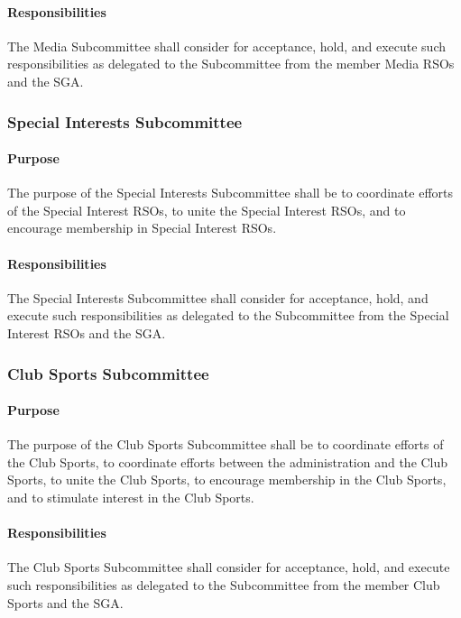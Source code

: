 \documentclass[12pt]{scrreprt}
\begin{document}
\paragraph{Responsibilities}
The Media Subcommittee shall consider for acceptance, hold, and
execute such responsibilities as delegated to the Subcommittee from the member Media
RSOs and the SGA.

\subsubsection{Special Interests Subcommittee}

\paragraph{Purpose}
The purpose of the Special Interests Subcommittee shall be to coordinate
efforts of the Special Interest RSOs, to unite the Special Interest RSOs, and to encourage
membership in Special Interest RSOs.

\paragraph{Responsibilities}
The Special Interests Subcommittee shall consider for acceptance,
hold, and execute such responsibilities as delegated to the Subcommittee from the Special
Interest RSOs and the SGA.

\subsubsection{Club Sports Subcommittee}

\paragraph{Purpose}
The purpose of the Club Sports Subcommittee shall be to coordinate efforts of
the Club Sports, to coordinate efforts between the administration and the Club Sports, to
unite the Club Sports, to encourage membership in the Club Sports, and to stimulate
interest in the Club Sports.

\paragraph{Responsibilities}
The Club Sports Subcommittee shall consider for acceptance, hold,
and execute such responsibilities as delegated to the Subcommittee from the member Club
Sports and the SGA.
\end{document}

